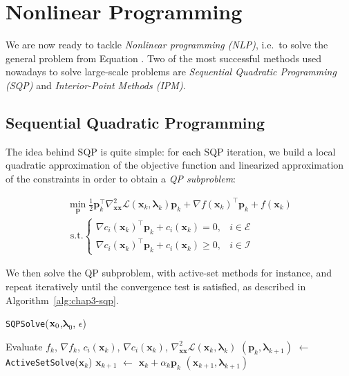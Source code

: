 \section{Nonlinear Programming}

We are now ready to tackle \emph{Nonlinear programming (NLP)}, i.e.\ to
solve the general problem from Equation . Two of the
most successful methods used nowadays to solve large-scale problems
are \emph{Sequential Quadratic Programming (SQP)} and
\emph{Interior-Point Methods (IPM)}.

\subsection{Sequential Quadratic Programming}
\label{subsubsec:chap3-sqp}

The idea behind SQP is quite simple: for each SQP iteration, we build
a local quadratic approximation of the objective function and
linearized approximation of the constraints in order to obtain a
\emph{QP subproblem}:

\begin{equation}
\label{eq:chap3-sqp}
\begin{array}{c}
\min_{\mathbf{p}}\frac{1}{2}\mathbf{p}_k^{\top}\nabla_{\mathbf{x}\mathbf{x}}^2\mathcal{L}(\mathbf{x}_k,\boldsymbol{\lambda}_k)\mathbf{p}_k+\nabla f(\mathbf{x}_k)^{\top}\mathbf{p}_k+f(\mathbf{x}_k)
\\
\text{ s.t.}
\left\{\begin{array}{cc}
\nabla c_i(\mathbf{x}_k)^{\top}\mathbf{p}_k+c_i(\mathbf{x}_k) = 0, & i \in \mathcal{E} \\
\nabla c_i(\mathbf{x}_k)^{\top}\mathbf{p}_k+c_i(\mathbf{x}_k) \ge 0, & i \in \mathcal{I}
\end{array}\right.
\end{array}
\end{equation}

We then solve the QP subproblem, with active-set methods for instance,
and repeat iteratively until the convergence test is satisfied, as
described in Algorithm~\ref{alg:chap3-sqp}.

\begin{algorithm}
\caption{\texttt{SQPSolve}($\mathbf{x}_0$,$\boldsymbol{\lambda}_0$, $\epsilon$)}
\label{alg:chap3-sqp}
\begin{algorithmic}
\STATE Evaluate $f_k$, $\nabla f_k$, $c_i(\mathbf{x}_k)$, $\nabla c_i(\mathbf{x}_k)$, $\nabla_{\mathbf{x}\mathbf{x}}^2\mathcal{L}(\mathbf{x}_k,\boldsymbol{\lambda}_k)$
\STATE $(\mathbf{p}_k, \boldsymbol{\lambda}_{k+1})$ $\leftarrow$ \texttt{ActiveSetSolve}($\mathbf{x}_k$)
\STATE $\mathbf{x}_{k+1}$ $\leftarrow$ $\mathbf{x}_k + \alpha_k\mathbf{p}_k$
\RETURN $(\mathbf{x}_{k+1},\boldsymbol{\lambda}_{k+1})$
\ENDIF
\ENDFOR
\end{algorithmic}
\end{algorithm}

